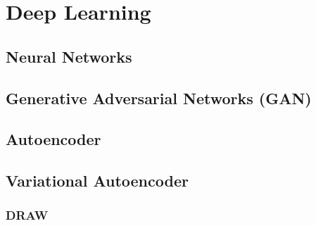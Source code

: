 
\chapter{Deep Learning}

\section{Neural Networks}
\section{Generative Adversarial Networks (GAN)}
\section{Autoencoder}
\section{Variational Autoencoder}
\subsection{DRAW}

